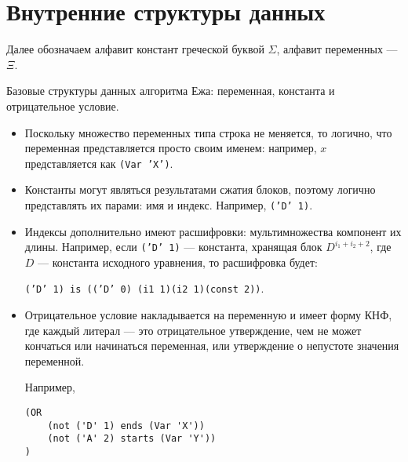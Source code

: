 \documentclass[12pt]{article}
\begin{document}
\section{Внутренние структуры данных}

Далее обозначаем алфавит констант греческой буквой $\Sigma$, алфавит переменных --- $\Xi$.

Базовые структуры данных алгоритма Ежа: переменная, константа и отрицательное условие.

\begin{itemize}
\item Поскольку множество переменных типа строка не меняется, то логично, что переменная представляется просто своим именем: например, $x$ представляется как \texttt{(Var 'X')}.
\item Константы могут являться результатами сжатия блоков, поэтому логично представлять их парами: имя и индекс. Например, \texttt{('D' 1)}.
\item Индексы дополнительно имеют расшифровки: мультимножества компонент их длины. Например, если \texttt{('D' 1)} --- константа, хранящая блок $D^{i_1 + i_2+2}$, где $D$ --- константа исходного уравнения, то расшифровка будет: 

\texttt{('D' 1) is (('D' 0) (i1 1)(i2 1)(const 2))}.
\item Отрицательное условие накладывается на переменную и имеет форму КНФ, где каждый литерал --- это отрицательное утверждение, чем не может кончаться или начинаться переменная, или утверждение о непустоте значения переменной. 

Например, \begin{verbatim}
(OR 
    (not ('D' 1) ends (Var 'X')) 
    (not ('A' 2) starts (Var 'Y'))
)
\end{verbatim}
\end{itemize}
\end{document}
